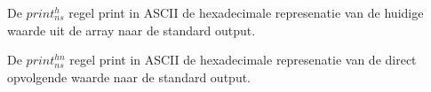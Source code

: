 \documentclass[11pt]{article}
\begin{document}
De $print^h_{ns}$ regel print in ASCII de hexadecimale represenatie van de huidige waarde uit de array naar de standard output.
\begin{prooftree}
\end{prooftree}

De $print^{hn}_{ns}$ regel print in ASCII de hexadecimale represenatie van de direct opvolgende waarde naar de standard output.
\begin{prooftree}
\end{prooftree}




%
\end{document}
